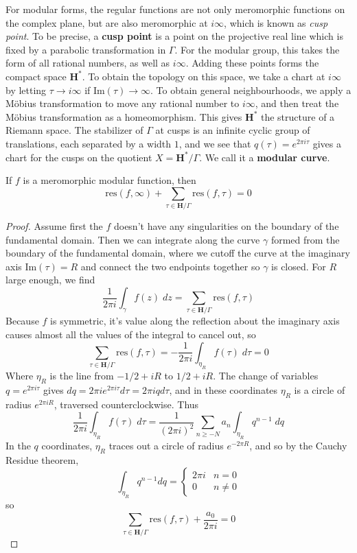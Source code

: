 For modular forms, the regular functions are not only meromorphic functions on the complex plane, but are also meromorphic at $i \infty$, which is known as {\it cusp point}. To be precise, a {\bf cusp point} is a point on the projective real line which is fixed by a parabolic transformation in $\Gamma$. For the modular group, this takes the form of all rational numbers, as well as $i \infty$. Adding these points forms the compact space $\mathbf{H}^*$. To obtain the topology on this space, we take a chart at $i \infty$ by letting $\tau \to i \infty$ if $\text{Im}(\tau) \to \infty$. To obtain general neighbourhoods, we apply a M\"{o}bius transformation to move any rational number to $i \infty$, and then treat the M\"{o}bius transformation as a homeomorphism. This gives $\mathbf{H}^*$ the structure of a Riemann space. The stabilizer of $\Gamma$ at cusps is an infinite cyclic group of translations, each separated by a width $1$, and we see that $q(\tau) = e^{2 \pi i \tau}$ gives a chart for the cusps on the quotient $X = \mathbf{H}^*/\Gamma$. We call it a {\bf modular curve}.

\begin{theorem}
    If $f$ is a meromorphic modular function, then
    \[ \text{res}(f,\infty) + \sum_{\tau \in \mathbf{H}/\Gamma} \text{res}(f,\tau) = 0 \]
\end{theorem}
\begin{proof}
    Assume first the $f$ doesn't have any singularities on the boundary of the fundamental domain. Then we can integrate along the curve $\gamma$ formed from the boundary of the fundamental domain, where we cutoff the curve at the imaginary axis $\text{Im}(\tau) = R$ and connect the two endpoints together so $\gamma$ is closed. For $R$ large enough, we find
    \[ \frac{1}{2 \pi i} \int_\gamma f(z)\; dz = \sum_{\tau \in \mathbf{H}/\Gamma} \text{res}(f,\tau)  \]
    Because $f$ is symmetric, it's value along the reflection about the imaginary axis causes almost all the values of the integral to cancel out, so
    \[ \sum_{\tau \in \mathbf{H}/\Gamma} \text{res}(f,\tau) = - \frac{1}{2 \pi i} \int_{\eta_R} f(\tau)\; d\tau = 0 \]
    Where $\eta_R$ is the line from $-1/2 + iR$ to $1/2 + iR$. The change of variables $q = e^{2 \pi i \tau}$ gives $dq = 2 \pi i e^{2 \pi i \tau} d\tau = 2 \pi i q d \tau$, and in these coordinates $\eta_R$ is a circle of radius $e^{2 \pi i R}$, traversed counterclockwise. Thus
    \[ \frac{1}{2 \pi i} \int_{\eta_R} f(\tau)\; d \tau = \frac{1}{(2 \pi i)^2} \sum_{n \geq -N} a_n \int_{\eta_R} q^{n-1}\; dq \]
    In the $q$ coordinates, $\eta_R$ traces out a circle of radius $e^{-2 \pi R}$, and so by the Cauchy Residue theorem,
    \[ \int_{\eta_R} q^{n-1} dq = \begin{cases} 2 \pi i & n = 0 \\ 0 & n \neq 0 \end{cases} \]
    so
    \[ \sum_{\tau \in \mathbf{H}/\Gamma} \text{res}(f,\tau) + \frac{a_0}{2 \pi i} = 0 \]
\end{proof}

